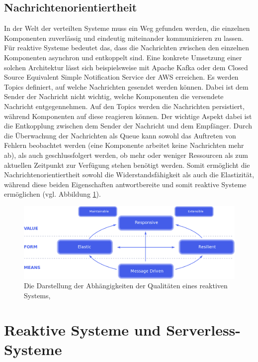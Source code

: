 \subsection{Nachrichtenorientiertheit}
In der Welt der verteilten Systeme muss ein Weg gefunden werden, die einzelnen Komponenten zuverlässig und eindeutig miteinander kommunizieren zu lassen. Für reaktive Systeme bedeutet das, dass die Nachrichten zwischen den einzelnen Komponenten asynchron und entkoppelt sind. Eine konkrete Umsetzung einer solchen Architektur lässt sich beispielsweise mit Apache Kafka oder dem Closed Source Equivalent Simple Notification Service der AWS erreichen. Es werden Topics definiert, auf welche Nachrichten gesendet werden können. Dabei ist dem Sender der Nachricht nicht wichtig, welche Komponenten die versendete Nachricht entgegennehmen. Auf den Topics werden die Nachrichten persistiert, während Komponenten auf diese reagieren können. Der wichtige Aspekt dabei ist die Entkopplung zwischen dem Sender der Nachricht und dem Empfänger. Durch die Überwachung der Nachrichten als Queue kann sowohl das Auftreten von Fehlern beobachtet werden (eine Komponente arbeitet keine Nachrichten mehr ab), als auch geschlussfolgert werden, ob mehr oder weniger Ressourcen als zum aktuellen Zeitpunkt zur Verfügung stehen benötigt werden. Somit ermöglicht die Nachrichtenorientiertheit sowohl die Widerstandsfähigkeit als auch die Elastizität, während diese beiden Eigenschaften antwortbereite und somit reaktive Systeme ermöglichen (vgl. Abbildung \ref{fig:reac}).
\begin{figure}[H]
    \centering
    \includegraphics[width = .9\textwidth]{images/resy.png}
    \caption{ Die Darstellung der Abhängigkeiten der Qualitäten eines reaktiven Systems, \cite{ReactiveManifesto}}
    \label{fig:reac}
\end{figure}

\section{Reaktive Systeme und Serverless-Systeme}
